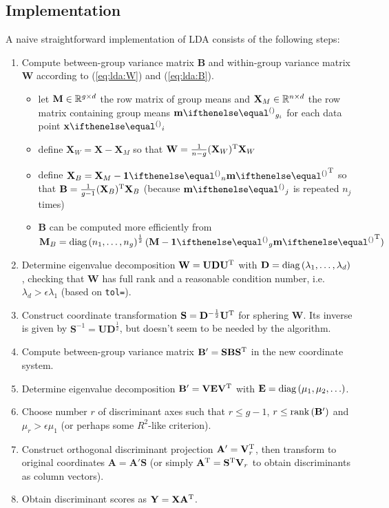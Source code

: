 \documentclass[a4paper]{article}
\begin{document}
\subsection{Implementation}
\label{sec:lda:implement}

A naive straightforward implementation of LDA consists of the following steps:

\begin{enumerate}
\item Compute between-group variance matrix $\mathbf{B}$ and within-group variance matrix $\mathbf{W}$ according to (\ref{eq:lda:W}) and (\ref{eq:lda:B}).
  \begin{itemize}
  \item let $\mathbf{M}\in \mathbb{R}^{g\times d}$ the row matrix of group means and $\mathbf{X}_M\in \mathbb{R}^{n\times d}$ the row matrix containing group means $\vm_{g_i}$ for each data point $\vx_i$
  \item define $\mathbf{X}_W = \mathbf{X} - \mathbf{X}_M$ so that $\mathbf{W} = \frac1{n - g} (\mathbf{X}_W)^{\text{T}} \mathbf{X}_W$
  \item define $\mathbf{X}_B = \mathbf{X}_M - \vone_n \vm\T$ so that $\mathbf{B} = \frac{1}{g - 1} (\mathbf{X}_B)^{\text{T}} \mathbf{X}_B$ (because $\vm_j$ is repeated $n_j$ times)
  \item $\mathbf{B}$ can be computed more efficiently from $\mathbf{M}_B = \Diag{n_1, \ldots, n_g}^{\frac12} (\mathbf{M} - \vone_g \vm\T)$
  \end{itemize}
\item Determine eigenvalue decomposition $\mathbf{W} = \mathbf{U} \mathbf{D} \mathbf{U}^{\text{T}}$ with $\mathbf{D} = \mathop{\text{diag}}\left(\lambda_1, \ldots, \lambda_d\right)$, checking that $\mathbf{W}$ has full rank and a reasonable condition number, i.e.\ $\lambda_d > \epsilon \lambda_1$ (based on \texttt{tol=}).
\item Construct coordinate transformation $\mathbf{S} = \mathbf{D}^{-\frac12} \mathbf{U}^{\text{T}}$ for sphering $\mathbf{W}$. Its inverse is given by $\mathbf{S}^{-1} = \mathbf{U} \mathbf{D}^{\frac12}$, but doesn't seem to be needed by the algorithm.
\item Compute between-group variance matrix $\mathbf{B}' = \mathbf{S} \mathbf{B} \mathbf{S}^{\text{T}}$ in the new coordinate system.
\item Determine eigenvalue decomposition $\mathbf{B}' = \mathbf{V} \mathbf{E} \mathbf{V}^{\text{T}}$ with $\mathbf{E} = \mathop{\text{diag}}\left(\mu_1, \mu_2, \ldots\right)$.
\item Choose number $r$ of discriminant axes such that $r\leq g-1$, $r\leq \mathop{\text{rank}}\left(\mathbf{B}'\right)$ and $\mu_r > \epsilon \mu_1$ (or perhaps some $R^2$-like criterion).
\item Construct orthogonal discriminant projection $\mathbf{A}' = \mathbf{V}_r^{\text{T}}$, then transform to original coordinates $\mathbf{A} = \mathbf{A}' \mathbf{S}$ (or simply $\mathbf{A}^{\text{T}} = \mathbf{S}^{\text{T}} \mathbf{V}_r$ to obtain discriminants as column vectors).
\item Obtain discriminant scores as $\mathbf{Y} = \mathbf{X} \mathbf{A}^{\text{T}}$.
\end{enumerate}
\end{document}
